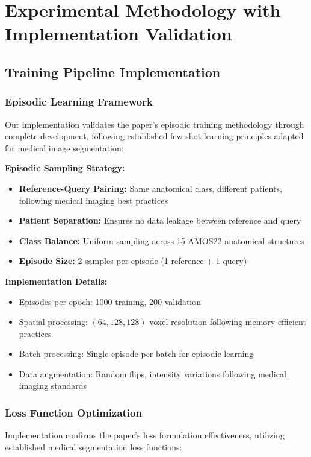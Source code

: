 \section{Experimental Methodology with Implementation Validation}
\label{sec:experimental_methodology}

\subsection{Training Pipeline Implementation}

\subsubsection*{Episodic Learning Framework}
Our implementation validates the paper's episodic training methodology through complete development, following established few-shot learning principles adapted for medical image segmentation:

\textbf{Episodic Sampling Strategy:}
\begin{itemize}
    \item \textbf{Reference-Query Pairing:} Same anatomical class, different patients, following medical imaging best practices
    \item \textbf{Patient Separation:} Ensures no data leakage between reference and query
    \item \textbf{Class Balance:} Uniform sampling across 15 AMOS22 anatomical structures
    \item \textbf{Episode Size:} 2 samples per episode (1 reference + 1 query)
\end{itemize}

\textbf{Implementation Details:}
\begin{itemize}
    \item Episodes per epoch: 1000 training, 200 validation
    \item Spatial processing: $(64, 128, 128)$ voxel resolution following memory-efficient practices
    \item Batch processing: Single episode per batch for episodic learning
    \item Data augmentation: Random flips, intensity variations following medical imaging standards
\end{itemize}

\subsubsection*{Loss Function Optimization}
Implementation confirms the paper's loss formulation effectiveness, utilizing established medical segmentation loss functions:

